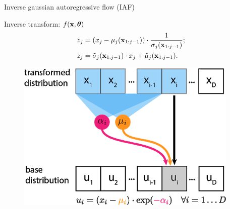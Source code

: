 \documentclass{beamer}
\begin{document}
\begin{frame}{Inverse gaussian autoregressive flow (IAF)}
	\begin{minipage}[t]{0.65\columnwidth}
		\begin{block}{Inverse transform: $f(\mathbf{x}, \boldsymbol{\theta})$}
			\vspace{-0.5cm}
			\begin{align*}
				z_j &= (x_j - \mu_j(\mathbf{x}_{1:j-1})) \cdot \frac{1}{\sigma_j (\mathbf{x}_{1:j-1}) }; \\
				z_j &= \tilde{\sigma}_j (\mathbf{x}_{1:j-1}) \cdot x_j + \tilde{\mu}_j(\mathbf{x}_{1:j-1}).
			\end{align*}
			\vspace{-0.4cm}
		\end{block}
	\end{minipage}%
	\begin{minipage}[t]{0.35\columnwidth}
		\begin{figure}[h]
			\centering
			\includegraphics[width=.9\linewidth]{figs/af_iaf_explained_2.png}
		\end{figure}
	\end{minipage}\\
	\vspace{0.1cm}
	

\end{frame}
\end{document}

